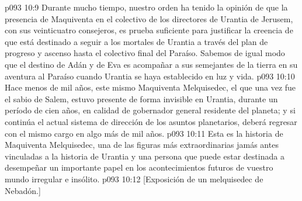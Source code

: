 \vs p093 10:9 Durante mucho tiempo, nuestro orden ha tenido la opinión de que la presencia de Maquiventa en el colectivo de los directores de Urantia de Jerusem, con sus veinticuatro consejeros, es prueba suficiente para justificar la creencia de que está destinado a seguir a los mortales de Urantia a través del plan de progreso y ascenso hasta el colectivo final del Paraíso. Sabemos de igual modo que el destino de Adán y de Eva es acompañar a sus semejantes de la tierra en su aventura al Paraíso cuando Urantia se haya establecido en luz y vida.
\vs p093 10:10 Hace menos de mil años, este mismo Maquiventa Melquisedec, el que una vez fue el sabio de Salem, estuvo presente de forma invisible en Urantia, durante un período de cien años, en calidad de gobernador general residente del planeta; y si continúa el actual sistema de dirección de los asuntos planetarios, deberá regresar con el mismo cargo en algo más de mil años.
\vs p093 10:11 \pc Esta es la historia de Maquiventa Melquisedec, una de las figuras más extraordinarias jamás antes vinculadas a la historia de Urantia y una persona que puede estar destinada a desempeñar un importante papel en los acontecimientos futuros de vuestro mundo irregular e insólito.
\vsetoff
\vs p093 10:12 [Exposición de un melquisedec de Nebadón.]
